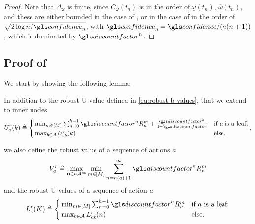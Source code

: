 \begin{subappendices}
\begin{proof}
		Note that $\Delta_\omega$ is finite, since $C_{\omega}(t_n)$ is in the order of $\underline{\omega}(t_n)$, $\overline{\omega}(t_n)$, and these are either bounded in the case of , or in the case of  in the order of $\sqrt{2\log n / \confidence_n}$, with $\confidence_n = \confidence/(n(n+1))$, which is dominated by $\discount^n$.
	\end{proof}
	
	
	\subsection{Proof of }
	\label{sec:proof-drop-regret}
		
	We start by showing the following lemma:
	
	\begin{lemma}
		\label{lemma:uvb}
		\begin{leftbar}[lemmabar]
		In addition to the robust U-value defined in \eqref{eq:robust-b-values}, that we extend to inner nodes	
		\begin{equation}
		\label{eq:br}
		U_a^r(k)  \eqdef
		\begin{cases}
		\min_{m\in[M]} \sum_{n=0}^{h-1} \discount^n R_n^m  + \frac{\discount^h}{1-\discount}&\text{if } a \text{ is a leaf;}\\
		\max_{b\in\mathcal{A}} U_{ab}^r(k) & \text{else.}
		\end{cases},
		\end{equation}
		
		we also define the robust value of a sequence of actions $a$
		\begin{equation}
		\label{eq:max_vr}
		V_a^r \eqdef \max_{\bu \in a\mathcal{A^\infty}} \min_{m\in[M]} \sum_{n=h(a)+1}^\infty \discount^n R^m_n
		\end{equation}
		and the robust U-values of a sequence of action $a$
		\begin{equation}
		\label{eq:ur}
		L_a^r(K)  \eqdef
		\begin{cases}
		\min_{m\in[M]} \sum_{n=0}^{h-1} \discount^n R_n^m &\text{if } a \text{ is a leaf;}\\
		\max_{b\in\mathcal{A}} L_{ab}^r(n) & \text{else.}
		\end{cases}
		\end{equation}
		

\end{leftbar}
\end{lemma}
\end{subappendices}
